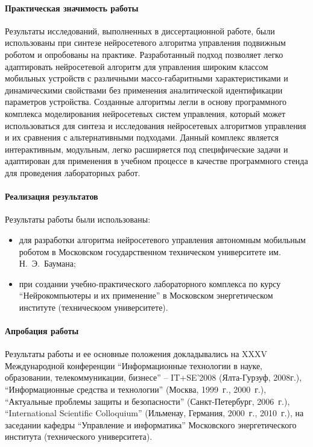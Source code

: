 \paragraph{Практическая значимость работы}
Результаты исследований, выполненных в диссертационной работе, были
использованы при синтезе нейросетевого алгоритма управления подвижным
роботом и опробованы на практике.  Разработанный подход позволяет
легко адаптировать нейросетевой алгоритм для управления широким
классом мобильных устройств с различными массо-габаритными
характеристиками и динамическими свойствами без применения
аналитической идентификации параметров устройства.  Созданные
алгоритмы легли в основу программного комплекса моделирования
нейросетевых систем управления, который может использоваться для
синтеза и исследования нейросетевых алгоритмов управления и их
сравнения с альтернативными подходами.  Данный комплекс является
интерактивным, модульным, легко расширяется под специфические задачи и
адаптирован для применения в учебном процессе в качестве программного
стенда для проведения лабораторных работ.

\paragraph{Реализация результатов}

Результаты работы были использованы:
\begin{itemize}
\item
для разработки алгоритма нейросетевого управления автономным мобильным
роботом в Московском государственном техническом университете
им. Н.~Э.~Баумана;
\item
при создании учебно-практического лабораторного комплекса по курсу
``Нейрокомпьютеры и их применение'' в Московском энергетическом
институте (техническоом университете).
\end{itemize}

\paragraph{Апробация работы} Результаты работы и ее основные положения
докладывались на XXXV Международной конференции ``Информационные
технологии в науке, образовании, телекоммуникации, бизнесе'' –
IT+SE’2008 (Ялта-Гурзуф, 2008г.), ``Информационные средства и
технологии'' (Москва, 1999~г., 2000~г.), ``Актуальные проблемы защиты
и безопасности'' (Санкт-Петербург, 2006~г.), ``International
Scientific Colloquium'' (Ильменау, Германия, 2000~г., 2010~г.), на
заседании кафедры ``Управление и информатика'' Московского
энергетического института (технического университета).

